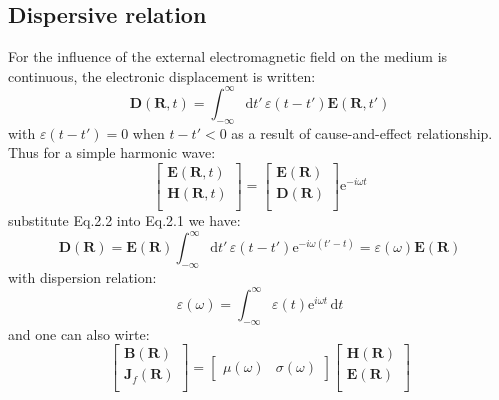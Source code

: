 \documentclass[11pt,a4paper,oneside]{book}
\begin{document}
\subsection{Dispersive relation}
For the influence of the external electromagnetic field on the medium is continuous, the electronic displacement is written:\begin{equation}
	\mathbf{D}(\mathbf{R},t)=\int_{-\infty}^\infty \text{d}t'\,\varepsilon(t-t') \mathbf{E}(\mathbf{R},t')
\end{equation}
with $\varepsilon(t-t')=0$ when $t-t'<0$ as a result of cause-and-effect relationship. Thus for a simple harmonic wave:\begin{equation}
	\begin{bmatrix}
		\mathbf{E}(\mathbf{R},t)\\
		\mathbf{H}(\mathbf{R},t)\\
	\end{bmatrix}
	=\begin{bmatrix}
		\mathbf{E}(\mathbf{R})\\
		\mathbf{D}(\mathbf{R})\\
	\end{bmatrix} \text{e}^{-i\omega t}
\end{equation}
substitute Eq.2.2 into Eq.2.1 we have:\begin{equation}
	\mathbf{D}(\mathbf{R})= \mathbf{E}(\mathbf{R}) \int_{-\infty}^\infty \text{d}t'\, \varepsilon(t-t') \text{e}^{-i\omega (t'-t)}= \varepsilon(\omega)\mathbf{E}(\mathbf{R})
\end{equation} 
with dispersion relation:\begin{equation}
	\varepsilon(\omega)=\int_{-\infty}^\infty \varepsilon(t)\text{e}^{i\omega t}\, \text{d}t
\end{equation}
and one can also wirte:\begin{equation}
	\begin{bmatrix}
		\mathbf{B}(\mathbf{R})\\
		\mathbf{J}_f(\mathbf{R})\\
	\end{bmatrix}=
	\begin{bmatrix}
		\mu(\omega)& \sigma(\omega)
	\end{bmatrix}
	\begin{bmatrix}
		\mathbf{H}(\mathbf{R})\\
		\mathbf{E}(\mathbf{R})\\
	\end{bmatrix}
\end{equation}
\end{document}
